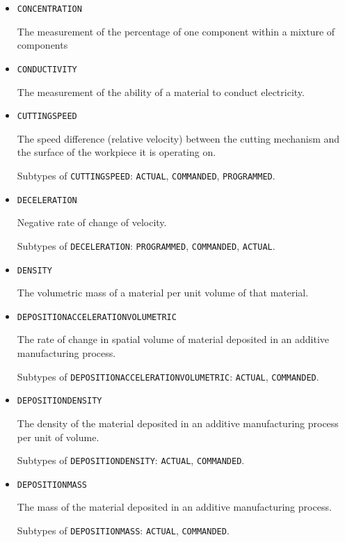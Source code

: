 \begin{itemize}
\item \texttt{CONCENTRATION}  

The measurement of the percentage of one component within a mixture of components


\item \texttt{CONDUCTIVITY}  

The measurement of the ability of a material to conduct electricity.


\item \texttt{CUTTING\textunderscore SPEED}  

The speed difference (relative velocity) between the cutting mechanism and the surface of the workpiece it is operating on.

Subtypes of \texttt{CUTTING\textunderscore SPEED}: \texttt{ACTUAL}, \texttt{COMMANDED}, \texttt{PROGRAMMED}.

\item \texttt{DECELERATION}  

Negative rate of change of velocity.

Subtypes of \texttt{DECELERATION}: \texttt{PROGRAMMED}, \texttt{COMMANDED}, \texttt{ACTUAL}.

\item \texttt{DENSITY}  

The volumetric mass of a material per unit volume of that material.


\item \texttt{DEPOSITION\textunderscore ACCELERATION\textunderscore VOLUMETRIC}  

The rate of change in spatial volume of material deposited in an additive manufacturing process.

Subtypes of \texttt{DEPOSITION\textunderscore ACCELERATION\textunderscore VOLUMETRIC}: \texttt{ACTUAL}, \texttt{COMMANDED}.

\item \texttt{DEPOSITION\textunderscore DENSITY}  

The density of the material deposited in an additive manufacturing process per unit of volume.

Subtypes of \texttt{DEPOSITION\textunderscore DENSITY}: \texttt{ACTUAL}, \texttt{COMMANDED}.

\item \texttt{DEPOSITION\textunderscore MASS}  

The mass of the material deposited in an additive manufacturing process.

Subtypes of \texttt{DEPOSITION\textunderscore MASS}: \texttt{ACTUAL}, \texttt{COMMANDED}.


\end{itemize}
